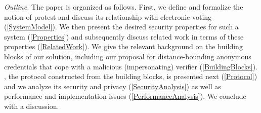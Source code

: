 \emph{Outline.} The paper is organized as follows. First, we define and 
formalize the notion of protest and discuss its relationship with electronic 
voting (\cref{SystemModel}).  We then present the desired security properties 
for such a system (\cref{Properties}) and subsequently discuss related work in 
terms of these properties (\cref{RelatedWork}). We give the relevant background 
on the building blocks of our solution, including our proposal for 
distance-bounding anonymous credentials that cope with a malicious 
(impersonating) verifier (\cref{BuildingBlocks}). \PRIVO, the protocol 
constructed from the building blocks, is presented next (\cref{Protocol}) and we 
analyze its security and privacy (\cref{SecurityAnalysis}) as well as 
performance and implementation issues (\cref{PerformanceAnalysis}). We conclude 
with a discussion.

